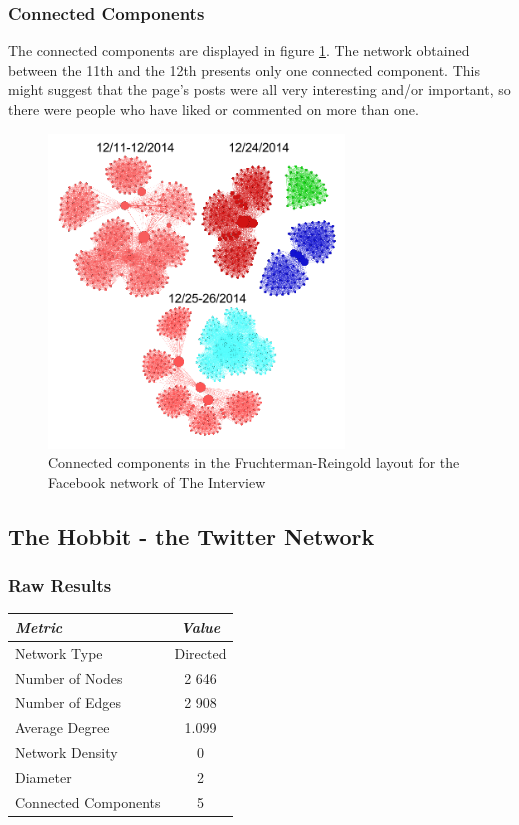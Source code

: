\documentclass{llncs}
\begin{document}
\subsubsection{Connected Components}
The connected components are displayed in figure
\ref{fig:interview-facebook-cc}. The network obtained between the 11th and the
12th presents only one connected component. This might suggest that the page's
posts were all very interesting and/or important, so there were people who have
liked or commented on more than one.
%
\begin{figure}
\centering
\includegraphics[width=0.7\textwidth]{interview-facebook-cc.png}
\caption{Connected components in the Fruchterman-Reingold layout for the
    Facebook network of The Interview
\label{fig:interview-facebook-cc}}
\end{figure}
%
\subsection{The Hobbit - the Twitter Network}
\subsubsection{Raw Results}
\begin{center}
    \begin{tabular}{ l | c }
        \hline
        \textit{Metric} & \textit{Value} \\ \hline
        Network Type & Directed \\ \hline
        Number of Nodes & 2 646 \\ \hline
        Number of Edges & 2 908 \\ \hline
        Average Degree & 1.099 \\ \hline
        Network Density & 0 \\ \hline
        Diameter & 2 \\ \hline
        Connected Components & 5 \\
        \hline
    \end{tabular}
\end{center}
%
\end{document}
